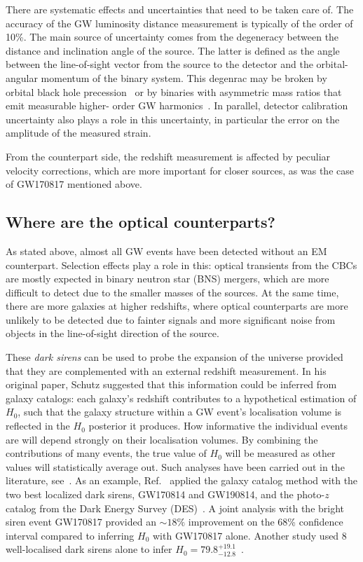 \documentclass[%
preprint,
nofootinbib,
 amsmath,amssymb,
 aps,
]{revtex4-2}
\begin{document}
There are systematic effects and uncertainties that need to be taken care of. The accuracy of the
GW luminosity distance measurement is typically of the order of 10\%. The main source of
uncertainty comes from the degeneracy between the distance and inclination angle of the source. The
latter is defined as the angle between the line-of-sight vector from the source to the detector and
the orbital-angular momentum of the binary system. This degenrac may be broken by orbital black
hole precession~\cite{Yun_2023} or by binaries with asymmetric mass ratios that emit measurable
higher- order GW harmonics~\cite{Vitale_2018}. In parallel, detector calibration uncertainty also
plays a role in this uncertainty, in particular the error on the amplitude of the measured strain.

From the counterpart side, the redshift measurement is affected by peculiar velocity corrections,
which are more important for closer sources, as was the case of GW170817 mentioned above.

\subsection{Where are the optical counterparts?}

As stated above, almost all GW events have been detected without an EM counterpart. Selection
effects play a role in this: optical transients from the CBCs are mostly expected in binary neutron
star (BNS) mergers, which are more difficult to detect due to the smaller masses of the sources. At
the same time, there are more galaxies at higher redshifts, where optical counterparts are more
unlikely to be detected due to fainter signals and more significant noise from objects in the
line-of-sight direction of the source.

These \textit{dark sirens} can be used to probe the expansion of the universe provided that they
are complemented with an external redshift measurement. In his original paper, Schutz suggested
that this information could be inferred from galaxy catalogs: each galaxy's redshift contributes to
a hypothetical estimation of $H_0$, such that the galaxy structure within a GW event's localisation
volume is reflected in the $H_0$ posterior it produces. How informative the individual events are
will depend strongly on their localisation volumes. By combining the contributions of many events,
the true value of $H_0$ will be measured as other values will statistically average out. Such
analyses have been carried out in the literature,
see~\cite{DelPozzo:2011vcw,Chen:2017rfc,LIGOScientific:2018gmd,Gray:2019ksv,DES:2019ccw}. As an
example, Ref.~ applied the galaxy catalog method with the two best
localized dark sirens, GW170814 and GW190814, and the photo-$z$ catalog from the Dark Energy Survey
(DES)~\cite{thedarkenergysurveycollaboration2005dark}. A joint analysis with the bright siren event
GW170817 provided an $\sim 18\%$ improvement on the 68\% confidence interval compared to inferring
$H_0$ with GW170817 alone. Another study used 8 well-localised dark sirens alone to infer $H_0 =
	79.8^{+19.1}_{-12.8}$~\cite{Palmese_2023}.
\end{document}
